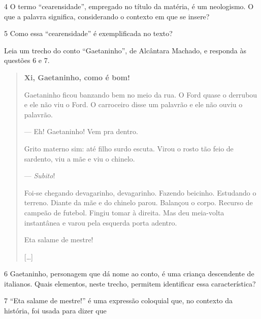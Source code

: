 \num{4} O termo ``cearensidade'', empregado no título da matéria, é um
neologismo. O que a palavra significa, considerando o contexto em que se
insere?


\num{5} Como essa ``cearensidade'' é exemplificada no texto?


\noindent Leia um trecho do conto ``Gaetaninho'', de Alcântara Machado, e responda
às questões 6 e 7.

\begin{quote}
\centering\textbf{Xi, Gaetaninho, como é bom!}\\
\medskip


\noindent Gaetaninho ficou banzando bem no meio da rua. O Ford quase o derrubou e
ele não viu o Ford. O carroceiro disse um palavrão e ele não ouviu o
palavrão.

— Eh! Gaetaninho! Vem pra dentro.

Grito materno sim: até filho surdo escuta. Virou o rosto tão feio de
sardento, viu a mãe e viu o chinelo.

— \emph{Subito}!

Foi-se chegando devagarinho, devagarinho. Fazendo beicinho. Estudando o
terreno. Diante da mãe e do chinelo parou. Balançou o corpo. Recurso de
campeão de futebol. Fingiu tomar à direita. Mas deu meia-volta
instantânea e varou pela esquerda porta adentro.

Eta salame de mestre!

{[}\ldots{}{]}

\end{quote}

\num{6} Gaetaninho, personagem que dá nome ao conto, é uma criança
descendente de italianos. Quais elementos, neste trecho, permitem
identificar essa característica?


\num{7} ``Eta salame de mestre!'' é uma expressão coloquial que, no
contexto da história, foi usada para dizer que

